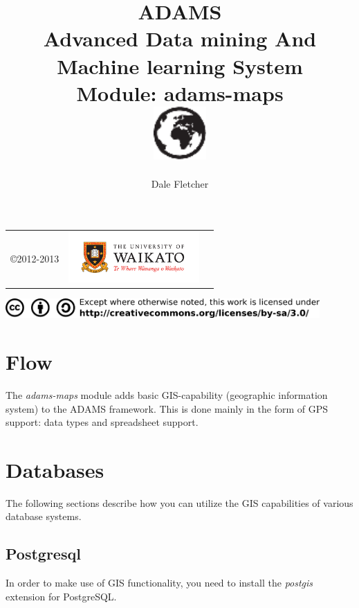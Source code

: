 \documentclass[a4paper]{book}
\title{
  \textbf{ADAMS} \\
  {\Large \textbf{A}dvanced \textbf{D}ata mining \textbf{A}nd \textbf{M}achine
  learning \textbf{S}ystem} \\
  {\Large Module: adams-maps} \\
  \vspace{1cm}
  \includegraphics[width=2cm]{images/maps-module.png} \\
}
\author{
  Dale Fletcher
}
\begin{document}
\begin{titlepage}
\maketitle

\thispagestyle{empty}
\center
\begin{table}[b]
	\begin{tabular}{c l l}
		\parbox[c][2cm]{2cm}{\copyright 2012-2013} &
		\parbox[c][2cm]{5cm}{\includegraphics[width=5cm]{images/coat_of_arms.pdf}}
	\end{tabular}
	\includegraphics[width=12cm]{images/cc.png} \\
\end{table}

\end{titlepage}

\tableofcontents

\chapter{Flow}

The \textit{adams-maps} module adds basic GIS-capability (geographic
information system) to the ADAMS framework. This is done mainly in the
form of GPS support: data types and spreadsheet support.


\chapter{Databases}

The following sections describe how you can utilize the GIS capabilities
of various database systems.

\section{Postgresql}
In order to make use of GIS functionality, you need to install the
\textit{postgis} extension\cite{postgis} for PostgreSQL\cite{postgresql}.
\end{document}
